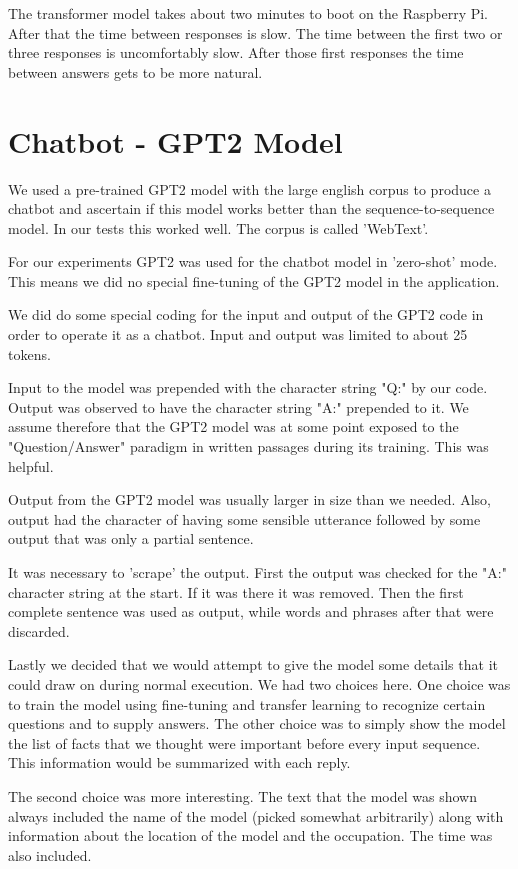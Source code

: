 The transformer model takes about two minutes to boot on the Raspberry Pi. After that the time between responses is slow. The time between the first two or three responses is uncomfortably slow. After those first responses the time between answers gets to be more natural.



\section{Chatbot - GPT2 Model}
We used a pre-trained GPT2 model with the large english corpus to produce a chatbot and ascertain if this model works better than the sequence-to-sequence model. In our tests this worked well. The corpus is called 'WebText'.

For our experiments GPT2 was used for the chatbot model in 'zero-shot' mode. This means we did no
special fine-tuning of the GPT2 model in the application.

We did do some special coding for the input and output of the GPT2 code in order to operate it as
a chatbot. Input and output was limited to about 25 tokens. 

Input to the model was prepended with the character string "Q:" by our code. Output was observed 
to have the character string "A:" prepended to it. We assume therefore that the GPT2 model was at some point
exposed to the "Question/Answer" paradigm in written passages during its training. This was helpful.

Output from the GPT2 model was 
usually larger in size than we needed. Also, output had the character of having some sensible utterance followed by some output that was only a partial sentence.

It was necessary to 'scrape' the output. First the output was checked for the "A:" character string at the start. If it was there it was removed. Then the first complete sentence was used as output, while words and phrases after that were discarded.

Lastly we decided that we would attempt to give the model some details that it could draw on 
during normal execution. We had two choices here. One choice was to train the model using fine-tuning and transfer learning to recognize certain questions and to supply answers. The other
choice was to simply show the model the list of facts that we thought were important before 
every input sequence. This information would be summarized with each reply.

The second choice was more interesting. The text that the model was shown always included the name of 
the model (picked somewhat arbitrarily) along with information about the location of the model
and the occupation. The time was also included.

